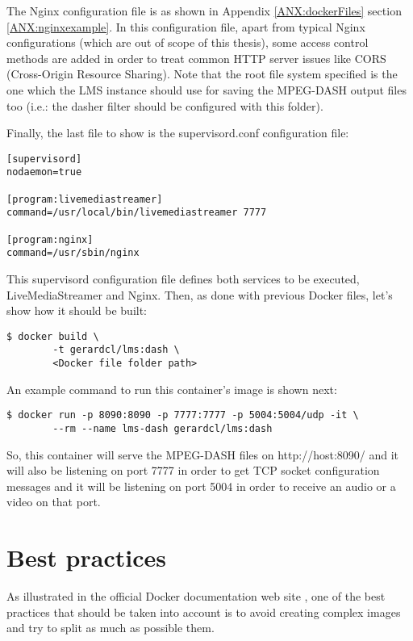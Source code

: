 The Nginx configuration file is as shown in Appendix \ref{ANX:dockerFiles} section \ref{ANX:nginxexample}. In this configuration file, apart from typical Nginx configurations (which are out of scope of this thesis), some access control methods are added in order to treat common HTTP server issues like CORS (Cross-Origin Resource Sharing). Note that the root file system specified is the one which the LMS instance should use for saving the MPEG-DASH output files too (i.e.: the dasher filter should be configured with this folder).

Finally, the last file to show is the supervisord.conf configuration file:

\begin{verbatim}
[supervisord]
nodaemon=true

[program:livemediastreamer]
command=/usr/local/bin/livemediastreamer 7777

[program:nginx]
command=/usr/sbin/nginx 
\end{verbatim}

This supervisord configuration file defines both services to be executed, LiveMediaStreamer and Nginx. Then, as done with previous Docker files, let's show how it should be built:

\begin{verbatim}
$ docker build \
		-t gerardcl/lms:dash \
		<Docker file folder path>
\end{verbatim}

An example command to run this container's image is shown next:

\begin{verbatim}
$ docker run -p 8090:8090 -p 7777:7777 -p 5004:5004/udp -it \
		--rm --name lms-dash gerardcl/lms:dash 
\end{verbatim}

So, this container will serve the MPEG-DASH files on http://host:8090/ and it will also be listening on port 7777 in order to get TCP socket configuration messages and it will be listening on port 5004 in order to receive an audio or a video on that port.

\section{Best practices}

As illustrated in the official Docker documentation web site \cite{dockerBP}, one of the best practices that should be taken into account is to avoid creating complex images and try to split as much as possible them.


